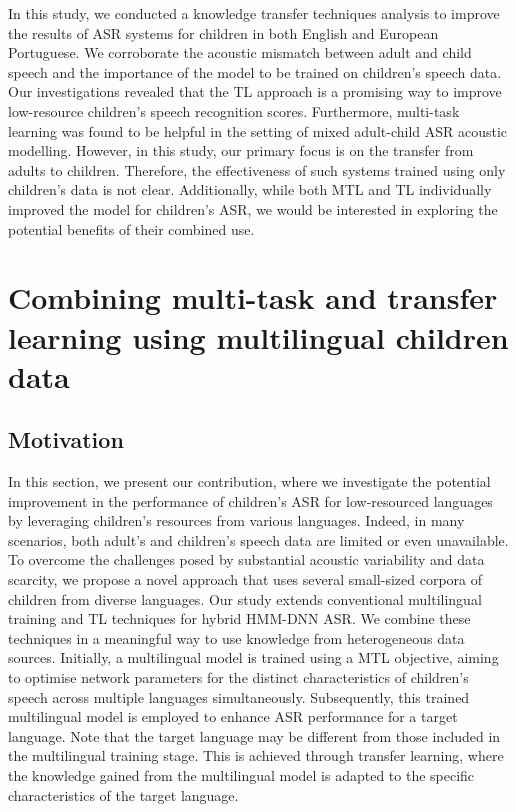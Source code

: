 In this study, we conducted a knowledge transfer techniques analysis to improve the results of \ac{ASR} systems for children in both English and European Portuguese. We corroborate the acoustic mismatch between adult and child speech and the importance of the model to be trained on children's speech data. Our investigations revealed that the \ac{TL} approach is a promising way to improve low-resource children's speech recognition scores. Furthermore, multi-task learning was found to be helpful in the setting of mixed adult-child \ac{ASR} acoustic modelling. 
However, in this study, our primary focus is on the transfer from adults to children. Therefore, the effectiveness of such systems trained using only children's data is not clear. Additionally, while both \ac{MTL} and \ac{TL} individually improved the model for children's \ac{ASR}, we would be interested in exploring the potential benefits of their combined use.


\section{Combining multi-task and transfer learning using multilingual children data}
\subsection{Motivation}
In this section, we present our contribution, where we investigate the potential improvement in the performance of children's \ac{ASR} for low-resourced languages by leveraging children's resources from various languages. Indeed, in many scenarios, both adult's and children's speech data are limited or even unavailable. To overcome the challenges posed by substantial acoustic variability and data scarcity, we propose a novel approach that uses several small-sized corpora of children from diverse languages. Our study extends conventional multilingual training and \ac{TL} techniques for hybrid \ac{HMM-DNN} \ac{ASR}. We combine these techniques in a meaningful way to use knowledge from heterogeneous data sources. Initially, a multilingual model is trained using a \ac{MTL} objective, aiming to optimise network parameters for the distinct characteristics of children's speech across multiple languages simultaneously. Subsequently, this trained multilingual model is employed to enhance \ac{ASR} performance for a target language. Note that the target language may be different from those included in the multilingual training stage. This is achieved through transfer learning, where the knowledge gained from the multilingual model is adapted to the specific characteristics of the target language.


